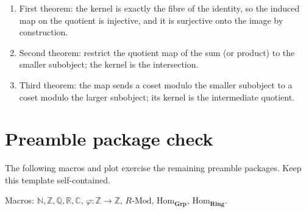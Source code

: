 \documentclass[11pt,letterpaper]{article}
\newcommand{\N}{\mathbb{N}}
\newcommand{\Z}{\mathbb{Z}}
\newcommand{\Q}{\mathbb{Q}}
\newcommand{\R}{\mathbb{R}}
\newcommand{\C}{\mathbb{C}}
\newcommand{\Map}[3]{#1 \colon #2 \to #3}
\newcommand{\Mod}[1]{#1\text{-}\mathrm{Mod}}
\newcommand{\GroupHom}{\mathrm{Hom}_{\mathbf{Grp}}}
\newcommand{\RingHom}{\mathrm{Hom}_{\mathbf{Ring}}}
\begin{document}
\begin{enumerate}[label=\arabic*.]
\item First theorem: the kernel is exactly the fibre of the identity, so the induced map on the quotient is injective, and it is surjective onto the image by construction.
\item Second theorem: restrict the quotient map of the sum (or product) to the smaller subobject; the kernel is the intersection.
\item Third theorem: the map sends a coset modulo the smaller subobject to a coset modulo the larger subobject; its kernel is the intermediate quotient.
\end{enumerate}

\section{Preamble package check}

The following macros and plot exercise the remaining preamble packages. Keep this template self-contained.

Macros: \(\N,\Z,\Q,\R,\C\), \(\Map{\varphi}{\Z}{\Z}\), \(\Mod{R}\), \(\GroupHom\), \(\RingHom\).

\begin{center}
\end{center}



\end{document}
